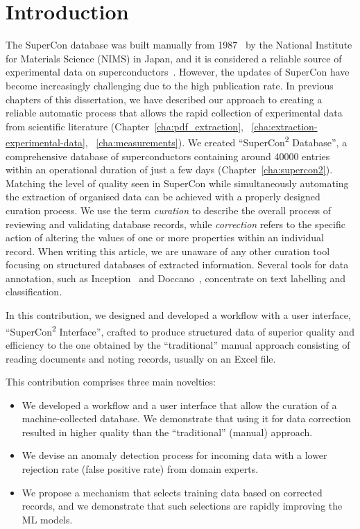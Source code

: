 \section{Introduction}

The SuperCon database was built manually from 1987~\cite{ishii2023structuring} by the National Institute for Materials Science (NIMS) in Japan, and it is considered a reliable source of experimental data on superconductors~\cite{roter2020predicting, stanev2017machine, tran2022machine, konno2021deep}. 
However, the updates of SuperCon have become increasingly challenging due to the high publication rate. 
In previous chapters of this dissertation, we have described our approach to creating a reliable automatic process that allows the rapid collection of experimental data from scientific literature (Chapter~\ref{cha:pdf_extraction}, ~\ref{cha:extraction-experimental-data}, ~\ref{cha:measurements}). 
We created ``SuperCon\textsuperscript{2} Database'', a comprehensive database of superconductors containing around 40000 entries within an operational duration of just a few days (Chapter~\ref{cha:supercon2}). 
Matching the level of quality seen in SuperCon while simultaneously automating the extraction of organised data can be achieved with a properly designed curation process. 
We use the term \emph{curation} to describe the overall process of reviewing and validating database records, while \emph{correction} refers to the specific action of altering the values of one or more properties within an individual record.
When writing this article, we are unaware of any other curation tool focusing on structured databases of extracted information. 
Several tools for data annotation, such as Inception~\cite{klie-etal-2018-inception} and Doccano~\cite{doccano}, concentrate on text labelling and classification.

In this contribution, we designed and developed a workflow with a user interface, ``SuperCon\textsuperscript{2} Interface'', crafted to produce structured data of superior quality and efficiency to the one obtained by the ``traditional'' manual approach consisting of reading documents and noting records, usually on an Excel file.

This contribution comprises three main novelties:
\begin{itemize}
    \item We developed a workflow and a user interface that allow the curation of a machine-collected database. We demonstrate that using it for data correction resulted in higher quality than the ``traditional'' (manual) approach.
    \item We devise an anomaly detection process for incoming data with a lower rejection rate (false positive rate) from domain experts.
    \item We propose a mechanism that selects training data based on corrected records, and we demonstrate that such selections are rapidly improving the ML models.
\end{itemize}

